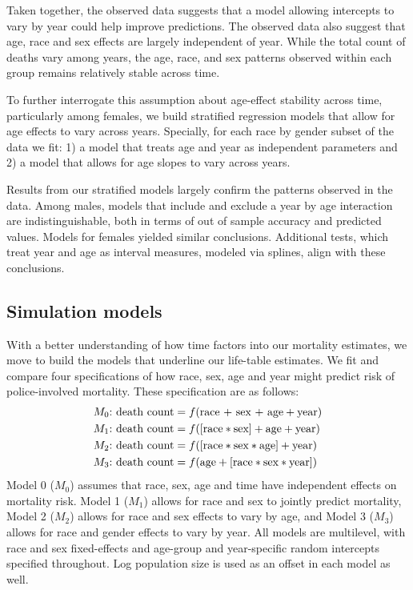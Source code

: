 \documentclass[9pt,twoside,lineno]{pnas-new}
\begin{document}
Taken together, the observed data suggests that a model allowing intercepts to vary by year could help improve predictions. The observed data also suggest that age, race and sex effects are largely independent of year. While the total count of deaths vary among years, the age, race, and sex patterns observed within each group remains relatively stable across time. 

To further interrogate this assumption about age-effect stability across time, particularly among females, we build stratified regression models that allow for age effects to vary across years. Specially, for each race by gender subset of the data we fit: 1) a model that treats age and year as independent parameters and 2) a model that allows for age slopes to vary across years. 

Results from our stratified models largely confirm the patterns observed in the data. Among males, models that include and exclude a year by age interaction are indistinguishable, both in terms of out of sample accuracy and predicted values. Models for females yielded similar conclusions. Additional tests, which treat year and age as interval measures, modeled via splines, align with these conclusions.  

\subsection*{Simulation models}  

With a better understanding of how time factors into our mortality estimates, we move to build the models that underline our life-table estimates. We fit and compare four specifications of how race, sex, age and year might predict risk of police-involved mortality. These specification are as follows: 
	\begin{align*}
		M_0\text{:} & \text{ death count} = f(\text{\text{race} + \text{sex} + age} + \text{year}) \\
		M_1\text{:} & \text{ death count} = f([\text{race}*\text{sex}] + \text{age} + \text{year}) \\
    M_2\text{:} & \text{ death count} = f([\text{race}*\text{sex}*\text{age}] + \text{year})   \\
		M_3\text{:} & \text{ death count} = f(\text{age} + [\text{race}*\text{sex}*\text{year}])   
	\end{align*}
Model 0 ($M_0$) assumes that race, sex, age and time have independent effects on mortality risk. Model 1 ($M_1$) allows for race and sex to jointly predict mortality, Model 2 ($M_2$) allows for race and sex effects to vary by age, and Model 3 ($M_3$) allows for race and gender effects to vary by year. All models are multilevel, with race and sex fixed-effects and age-group and year-specific random intercepts specified throughout. Log population size is used as an offset in each model as well.  
\end{document}
